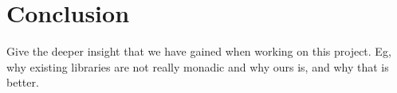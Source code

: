 \section{Conclusion}

Give the deeper insight that we have gained when working on this project. Eg, why existing libraries are not really monadic and why ours is, and why that is better.

